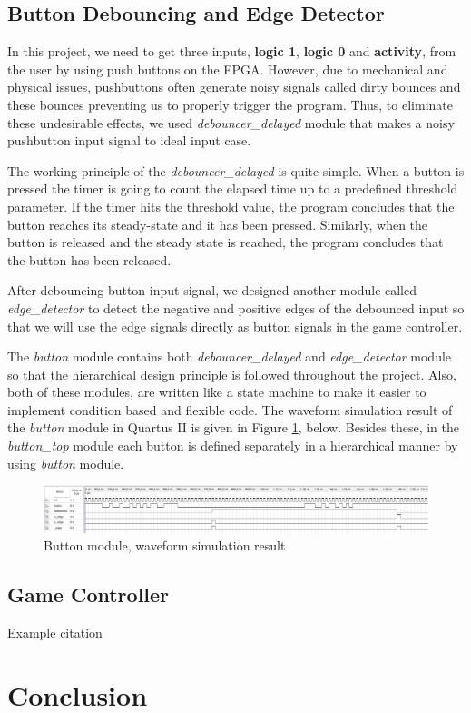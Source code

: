 \documentclass[conference]{IEEEtran}
\begin{document}
\subsection{Button Debouncing and Edge Detector}
In this project, we need to get three inputs, \textbf{logic 1}, \textbf{logic 0} and \textbf{activity}, from the user by using push buttons on the FPGA. However, due to mechanical and physical issues, pushbuttons often generate noisy signals called dirty bounces and these bounces preventing us to properly trigger the program. Thus, to eliminate these undesirable effects, we used \textit{debouncer\_delayed} module that makes a noisy pushbutton input signal to ideal input case. \\
\par The working principle of the \textit{debouncer\_delayed} is quite simple. When a button is pressed the timer is going to count the elapsed time up to a predefined threshold parameter. If the timer hits the threshold value, the program concludes that the button reaches its steady-state and it has been pressed. Similarly, when the button is released and the steady state is reached, the program concludes that the button has been released. \\
\par After debouncing button input signal, we designed another module called \textit{edge\_detector} to detect the negative and positive edges of the debounced input so that we will use the edge signals directly as button signals in the game controller. \\
\par The \textit{button} module contains both \textit{debouncer\_delayed} and \textit{edge\_detector} module so that the hierarchical design principle is followed throughout the project. Also, both of these modules, are written like a state machine to make it easier to implement condition based and flexible code. The waveform simulation result of the \textit{button} module in Quartus II is given in Figure \ref{Fig. 1.}, below. Besides these, in the \textit{button\_top} module each button is defined separately in a hierarchical manner by using \textit{button} module.
 \begin{figure}[H]
   \centerline{\includegraphics[scale=0.22]{simulation.png}}
    \caption{Button module, waveform simulation result}
    \label{Fig. 1.}
\end{figure} 
\subsection{Game Controller}

Example citation \cite{butterworth}
\section{Conclusion}



\end{document}
